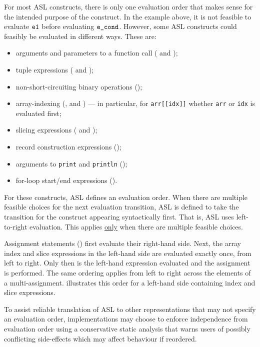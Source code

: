 For most ASL constructs, there is only one evaluation order that makes sense for the intended purpose of the construct.
In the example above, it is not feasible to evaluate $\texttt{e1}$ before evaluating $\texttt{e\_cond}$.
However, some ASL constructs could feasibly be evaluated in different ways.
These are:
\begin{itemize}
  \item arguments and parameters to a function call ( and );
  \item tuple expressions ( and );
  \item non-short-circuiting binary operations ();
  \item array-indexing (, and ) --- in particular, for
        \verb|arr[[idx]]| whether \verb|arr| or \verb|idx| is evaluated first;
  \item slicing expressions ( and );
  \item record construction expressions ();
  \item arguments to \verb|print| and \verb|println| ();
  \item for-loop start/end expressions ().
\end{itemize}

For these constructs, ASL defines an evaluation order.
When there are multiple feasible choices for the next evaluation transition, ASL is defined to take the transition
for the construct appearing syntactically first. That is, ASL uses left-to-right evaluation.
This applies \underline{only} when there are multiple feasible choices.

Assignment statements () first evaluate their
right-hand side.  Next, the array index and slice expressions in the left-hand
side are evaluated exactly once, from left to right.  Only then is the
left-hand expression evaluated and the assignment is performed.  The same ordering applies from left
to right across the elements of a multi-assignment.
 illustrates this order for a
left-hand side containing \ARBITRARY{} index and slice expressions.

To assist reliable translation of ASL to other representations that may not specify an evaluation order, implementations may choose to enforce independence from evaluation order using a conservative static analysis that warns users of possibly conflicting side-effects which may affect behaviour if reordered.

